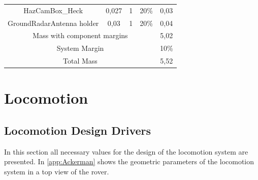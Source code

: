 \begin{table}[hbt]
{\begin{tabular}{@{}llllll@{}}
\multicolumn{2}{c}{HazCamBox\_Heck}                  & \multicolumn{1}{c}{0,027}                        & \multicolumn{1}{c}{1}        & \multicolumn{1}{c}{20\%}             & \multicolumn{1}{c}{0,03}           \\
\multicolumn{2}{c}{GroundRadarAntenna  holder}       & \multicolumn{1}{c}{0,03}                         & \multicolumn{1}{c}{1}        & \multicolumn{1}{c}{20\%}             & \multicolumn{1}{c}{0,04}           \\ \midrule
\multicolumn{5}{c}{Mass with component margins}                                                                                                                               & \multicolumn{1}{c}{5,02}           \\
\multicolumn{5}{c}{System Margin}                                                                                                                                             & \multicolumn{1}{c}{10\%}           \\
\multicolumn{5}{c}{Total Mass}                                                                                                                                                & \multicolumn{1}{c}{5,52}           \\\bottomrule
\end{tabular}%
}
\label{tab:ChassiBudget}
\end{table}




\clearpage

\setcounter{figure}{0}
\setcounter{table}{0}

\section{Locomotion} 
\label{app:Loco}

\subsection{Locomotion Design Drivers}
\label{app:DesignDrivers}

In this section all necessary values for the design of the locomotion system are presented. In \autoref{app:Ackerman} shows the geometric parameters of the locomotion system in a top view of the rover.


